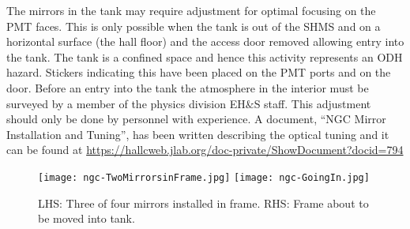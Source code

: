 {The mirrors in the tank may require adjustment for optimal focusing on
the PMT faces. This is only possible when the tank is out of the SHMS
and on a horizontal surface (the hall floor) and the access door
removed allowing entry into the tank. The tank is a confined space and
hence this activity represents an ODH hazard. Stickers indicating this
have been placed on the PMT ports and on the door. Before an entry
into the tank the atmosphere in the interior must be surveyed by a
member of the physics division EH$\&$S staff.  This adjustment should
only be done by personnel with experience. A document, ``NGC Mirror
Installation and Tuning'', has been written describing the optical
tuning and it can be found at
\url{https://hallcweb.jlab.org/doc-private/ShowDocument?docid=794}

\begin{figure}[!h] %
   \centering
   \texttt{[image: ngc-TwoMirrorsinFrame.jpg]}
   \texttt{[image: ngc-GoingIn.jpg]} 
   \caption{LHS: Three of four mirrors installed in frame. RHS: Frame
     about to be moved into tank.\label{fig:install}}
   
   \end{figure}
}%
